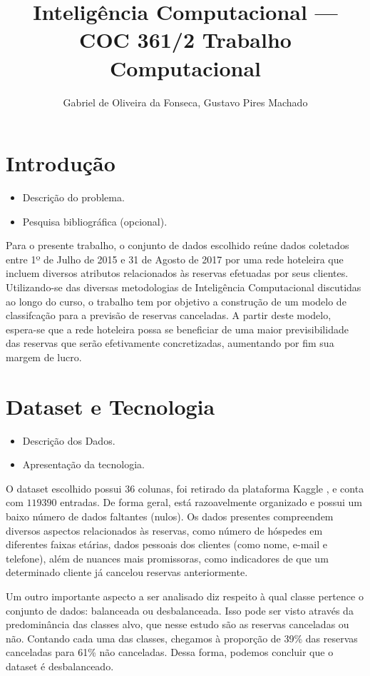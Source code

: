 \documentclass{homework}
\title{Inteligência Computacional --- COC 361\linebreak2021/2 \linebreak\linebreak Trabalho Computacional}
\author{Gabriel de Oliveira da Fonseca, Gustavo Pires Machado}
\begin{document}
\maketitle

\section{Introdução}

\begin{itemize}
\color{red}
    \item Descrição do problema.
    \item Pesquisa bibliográfica (opcional).
\end{itemize}

Para o presente trabalho, o conjunto de dados escolhido reúne dados coletados entre 1º de Julho de 2015 e 31 de Agosto
de 2017 por uma rede hoteleira que incluem diversos atributos relacionados às reservas efetuadas por seus clientes.
Utilizando-se das diversas metodologias de Inteligência Computacional discutidas ao longo do curso, o trabalho tem por
objetivo a construção de um modelo de classifcação para a previsão de reservas canceladas. A partir deste modelo,
espera-se que a rede hoteleira possa se beneficiar de uma maior previsibilidade das reservas que serão efetivamente
concretizadas, aumentando por fim sua margem de lucro.

\section{Dataset e Tecnologia}

\begin{itemize}
\color{red}
    \item Descrição dos Dados.
    \item Apresentação da tecnologia.
\end{itemize}

O dataset escolhido possui 36 colunas, foi retirado da plataforma Kaggle \cite{kaggle}, e conta com $119390$ entradas. 
De forma geral, está razoavelmente organizado e possui um baixo número de dados faltantes (nulos). Os dados presentes
compreendem diversos aspectos relacionados às reservas, como número de hóspedes em diferentes faixas etárias, dados
pessoais dos clientes (como nome, e-mail e telefone), além de nuances mais promissoras, como indicadores de que um
determinado cliente já cancelou reservas anteriormente.

Um outro importante aspecto a ser analisado diz respeito à qual classe pertence o conjunto de dados: balanceada ou
desbalanceada. Isso pode ser visto através da predominância das classes alvo, que nesse estudo são as reservas
canceladas ou não. Contando cada uma das classes, chegamos à proporção de 39\% das reservas canceladas para 61\% não
canceladas. Dessa forma, podemos concluir que o dataset é desbalanceado.
\end{document}
